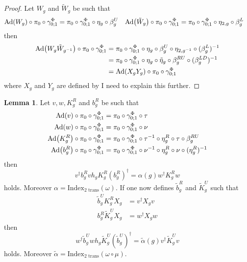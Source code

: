 \documentclass[12pt,a4paper,twoside]{article}
\let\originalleft\left
\let\originalright\right
\renewcommand{\left}{\mathopen{}\mathclose\bgroup\originalleft}
\renewcommand{\right}{\aftergroup\egroup\originalright}
\newcommand{\Ad}[1]{\textrm{Ad}\left(#1\right)}
\theoremstyle{definition}
\newtheorem{lemma}[theorem]{Lemma}
\numberwithin{equation}{section}
\begin{document}
\begin{proof}
	Let $W_g$ and $\tilde W_g$ be such that
	\begin{align}
		\Ad{W_g}\circ\pi_0\circ\gamma^\Phi_{0;1}& =\pi_0\circ\gamma^\Phi_{0;1}\circ\eta_g\circ\beta_g^U
		&\Ad{\tilde W_g} \circ\pi_0\circ\gamma^\Phi_{0;1}& =\pi_0\circ\gamma^\Phi_{0;1}\circ\eta_{2,g}\circ\beta_g^L
	\end{align}
	then
	\begin{align}
		\Ad{W_g\tilde{W}_{g^{-1}}}\circ\pi_0\circ\gamma^\Phi_{0;1}&=\pi_0\circ\gamma^\Phi_{0;1}\circ\eta_g\circ\beta_g^U\circ\eta_{2,g^{-1}}\circ(\beta_g^L)^{-1}\\
		&=\pi_0\circ\gamma^\Phi_{0;1}\circ\eta_g\circ\tilde{\eta}_g\circ\beta_g^{RU}\circ(\beta_g^{LD})^{-1}\\
		&=\Ad{X_gY_g}\circ \pi_0\circ\gamma^\Phi_{0;1}
	\end{align}
	where $X_g$ and $Y_g$ are defined by {\color{red}I need to explain this further}.
\end{proof}
\begin{lemma}
	Let $v,w,K_g^R$ and $b_g^R$ be such that
	\begin{align}
		\Ad{v}\circ\pi_0\circ\gamma^\Phi_{0;1}&=\pi_0\circ\gamma^\Phi_{0;1}\circ\tau\\
		\Ad{w}\circ\pi_0\circ\gamma^\Phi_{0;1}&=\pi_0\circ\gamma^\Phi_{0;1}\circ\nu\\
		\Ad{K_g^R}\circ\pi_0\circ\gamma^\Phi_{0;1}&=\pi_0\circ\gamma^\Phi_{0;1}\circ\tau^{-1}\circ\eta_g^R\circ\tau\circ\beta_g^{RU}\\
		\Ad{b_g^R}\circ\pi_0\circ\gamma^\Phi_{0;1}&=\pi_0\circ\gamma^\Phi_{0;1}\circ\nu^{-1}\circ\eta_g^R\circ\nu\circ(\eta_g^R)^{-1}
	\end{align}
	then
	\begin{equation}\label{eq:H^1IndexRotationInvariantHorizontalIndex}
		v^\dagger b_g^R vh_g K_g^R (b_g^R)^\dagger=\alpha(g)w^\dagger K_g^R w
	\end{equation}
	holds. Moreover $\alpha=\textrm{Index}_{\text{2 trans}}(\omega)$. If one now defines $\tilde{b}_g^R$ and $\tilde{K}_g^U$ such that
	\begin{align}
		\label{eq:H^1IndexRotationInvariantFirstDefinition}
		\tilde{b}_g^UK_g^R X_g&=v^\dagger X_g v\\
		\label{eq:H^1IndexRotationInvariantSecondDefinition}
		b_g^R\tilde{K}_g^UX_g&=w^\dagger X_g w
	\end{align}
	then
	\begin{equation}\label{eq:H^1IndexRotationInvariantVerticalIndex}
		w^\dagger \tilde b_g^U wh_g \tilde K_g^U (\tilde b_g^U)^\dagger=\tilde\alpha(g)v^\dagger \tilde K_g^U v
	\end{equation}
	holds. Moreover $\tilde\alpha=\textrm{Index}_{\text{2 trans}}(\omega\circ\mu)$.
\end{lemma}
\end{document}
